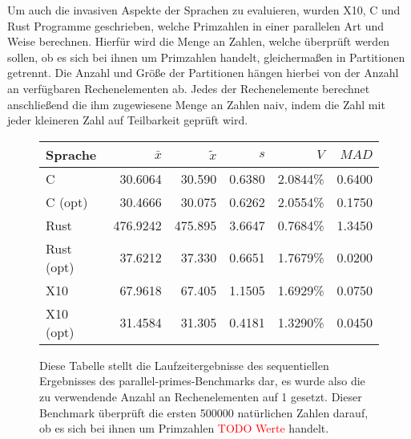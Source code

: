 Um auch die invasiven Aspekte der Sprachen zu evaluieren, wurden X10, C und Rust Programme geschrieben,
welche Primzahlen in einer parallelen Art und Weise berechnen.
Hierfür wird die Menge an Zahlen, welche überprüft werden sollen,
ob es sich bei ihnen um Primzahlen handelt, gleichermaßen in Partitionen getrennt.
Die Anzahl und Größe der Partitionen hängen hierbei von der Anzahl an verfügbaren Rechenelementen ab.
Jedes der Rechenelemente berechnet anschließend die ihm zugewiesene Menge an Zahlen naiv,
indem die Zahl mit jeder kleineren Zahl auf Teilbarkeit geprüft wird.

\begin{figure}[hb]
	\begin{center}
		\begin{tabular}{lrrrrr}
			\toprule
			Sprache & $\bar{x}$ & $\tilde{x}$ & $s$ & $V$ & $MAD$ \\
			\midrule
			C          & 30.6064 & 30.590 & 0.6380 & 2.0844\% & 0.6400 \\
			C (opt)    & 30.4666 & 30.075 & 0.6262 & 2.0554\% & 0.1750 \\
			Rust       & 476.9242 & 475.895 & 3.6647 & 0.7684\% & 1.3450 \\
			Rust (opt) & 37.6212 & 37.330 & 0.6651 & 1.7679\% & 0.0200 \\
			X10        & 67.9618 & 67.405 & 1.1505 & 1.6929\% & 0.0750 \\
			X10 (opt)  & 31.4584 & 31.305 & 0.4181 & 1.3290\% & 0.0450 \\
			\bottomrule
		\end{tabular}
	\end{center}
	\caption{
		Diese Tabelle stellt die Laufzeitergebnisse des sequentiellen Ergebnisses des parallel-primes-Benchmarks dar,
		es wurde also die zu verwendende Anzahl an Rechenelementen auf 1 gesetzt.
		Dieser Benchmark überprüft die ersten 500000 natürlichen Zahlen darauf, ob es sich bei ihnen um Primzahlen
		\textcolor{red}{TODO Werte} handelt.
	}
	\label{fig:primes_parallel_one_table}
\end{figure}

